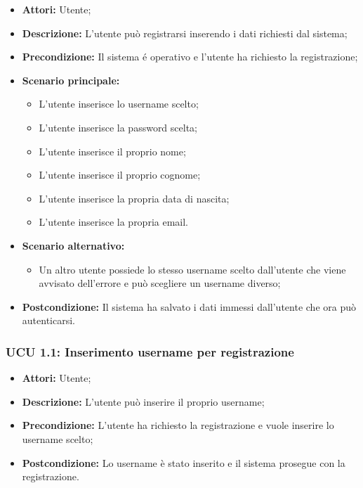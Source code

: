\begin{itemize}
	\item \textbf{Attori:} Utente;
	\item \textbf{Descrizione:} L'utente può registrarsi inserendo i dati richiesti dal sistema;
	\item \textbf{Precondizione:} Il sistema é operativo e l'utente ha richiesto la registrazione;
	\item \textbf{Scenario principale:}
	\begin{itemize}
		\item L'utente inserisce lo username scelto;
		\item L'utente inserisce la password scelta;
		\item L'utente inserisce il proprio nome;
		\item L'utente inserisce il proprio cognome;
		\item L'utente inserisce la propria data di nascita;
		\item L'utente inserisce la propria email.
	\end{itemize}
	\item \textbf{Scenario alternativo:}
	\begin{itemize}
		\item Un altro utente possiede lo stesso username scelto dall'utente che viene avvisato dell'errore e può scegliere un username diverso;
	\end{itemize}
	\item \textbf{Postcondizione:} Il sistema ha salvato i dati immessi dall'utente che ora può autenticarsi.
\end{itemize}

\hypertarget{U1.1}{}
\subsubsection{UCU 1.1: Inserimento username per registrazione}
\begin{itemize}
	\item \textbf{Attori:} Utente;
	\item \textbf{Descrizione:} L'utente può inserire il proprio username;
	\item \textbf{Precondizione:} L'utente ha richiesto la registrazione e vuole inserire lo username scelto;
	\item \textbf{Postcondizione:} Lo username è stato inserito e il sistema prosegue con la registrazione.
\end{itemize}

